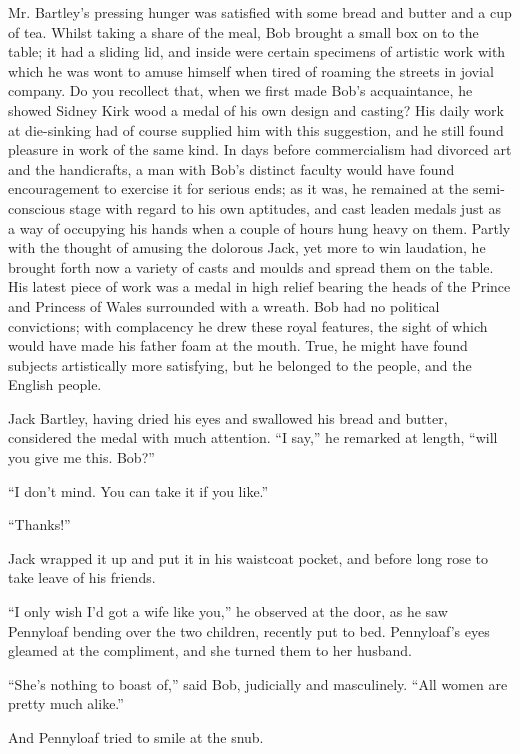 Mr. Bartley's pressing hunger was satisfied with some bread and butter
and a cup of tea. Whilst taking a share of the meal, Bob brought a small
box on to the table; it had a sliding lid, and inside were certain
specimens of artistic work with which he was wont to amuse himself when
tired of roaming the streets in jovial company. Do you recollect that,
when we first made Bob's acquaintance, he showed Sidney Kirk wood a
medal of his own design and casting? His daily work at die-sinking had
of course supplied him with this suggestion, and he still found pleasure
in work of the same kind. In days before commercialism had divorced art
and the handicrafts, a man with Bob's distinct faculty would have found
encouragement to exercise it for serious ends; as it was, he remained at
the semi-conscious stage with regard to his own aptitudes, and cast
leaden medals just as a way of occupying his hands when a couple of
hours hung heavy on them. Partly with the thought of amusing the
dolorous Jack, yet more to win {\protect\hypertarget{229}{}{}}laudation,
he brought forth now a variety of casts and moulds and spread them on
the table. His latest piece of work was a medal in high relief bearing
the heads of the Prince and Princess of Wales surrounded with a wreath.
Bob had no political convictions; with complacency he drew these royal
features, the sight of which would have made his father foam at the
mouth. True, he might have found subjects artistically more satisfying,
but he belonged to the people, and the English people.

Jack Bartley, having dried his eyes and swallowed his bread and butter,
considered the medal with much attention. ``I say,'' he remarked at
length, ``will you give me this. Bob?''

``I don't mind. You can take it if you like.''

``Thanks!''

Jack wrapped it up and put it in his waistcoat pocket, and before long
rose to take leave of his friends.

``I only wish I'd got a wife like you,'' he observed at the door, as he
saw Pennyloaf bending over the two children, recently put to bed.
{\protect\hypertarget{230}{}{}}Pennyloaf's eyes gleamed at the
compliment, and she turned them to her husband.

``She's nothing to boast of,'' said Bob, judicially and masculinely.
``All women are pretty much alike.''

And Pennyloaf tried to smile at the snub.

